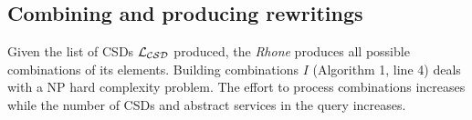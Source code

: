 \subsection{Combining and producing rewritings}
Given the list of CSDs $\hbox{${\cal L_{CSD}}$}$ produced, the \textit{Rhone} produces all possible combinations of its elements. 
Building combinations $I$ (Algorithm 1, line 4) deals with a NP hard complexity problem.
The effort to process combinations increases while the number of CSDs and abstract services in the query increases.


